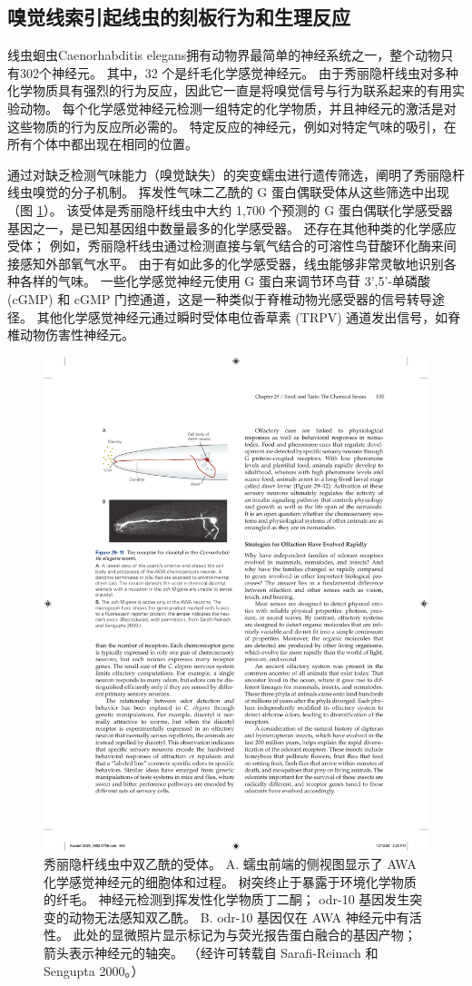 \subsection{嗅觉线索引起线虫的刻板行为和生理反应}
线虫蛔虫Caenorhabditis elegans拥有动物界最简单的神经系统之一，整个动物只有302个神经元。 其中，32 个是纤毛化学感觉神经元。 由于秀丽隐杆线虫对多种化学物质具有强烈的行为反应，因此它一直是将嗅觉信号与行为联系起来的有用实验动物。 每个化学感觉神经元检测一组特定的化学物质，并且神经元的激活是对这些物质的行为反应所必需的。 特定反应的神经元，例如对特定气味的吸引，在所有个体中都出现在相同的位置。

通过对缺乏检测气味能力（嗅觉缺失）的突变蠕虫进行遗传筛选，阐明了秀丽隐杆线虫嗅觉的分子机制。 
挥发性气味二乙酰的 G 蛋白偶联受体从这些筛选中出现（图 \ref{fig:29_11}）。 
该受体是秀丽隐杆线虫中大约 1,700 个预测的 G 蛋白偶联化学感受器基因之一，是已知基因组中数量最多的化学感受器。 还存在其他种类的化学感应受体； 例如，秀丽隐杆线虫通过检测直接与氧气结合的可溶性鸟苷酸环化酶来间接感知外部氧气水平。 由于有如此多的化学感受器，线虫能够非常灵敏地识别各种各样的气味。 一些化学感觉神经元使用 G 蛋白来调节环鸟苷 3',5'-单磷酸 (cGMP) 和 cGMP 门控通道，这是一种类似于脊椎动物光感受器的信号转导途径。 其他化学感觉神经元通过瞬时受体电位香草素 (TRPV) 通道发出信号，如脊椎动物伤害性神经元。

\begin{figure}[htbp]
	\centering
	\includegraphics[width=0.5\linewidth]{chap29/fig_29_11}
	\caption{秀丽隐杆线虫中双乙酰的受体。 A. 蠕虫前端的侧视图显示了 AWA 化学感觉神经元的细胞体和过程。 树突终止于暴露于环境化学物质的纤毛。 神经元检测到挥发性化学物质丁二酮； odr-10 基因发生突变的动物无法感知双乙酰。 B. odr-10 基因仅在 AWA 神经元中有活性。 此处的显微照片显示标记为与荧光报告蛋白融合的基因产物； 箭头表示神经元的轴突。 （经许可转载自 Sarafi-Reinach 和 Sengupta 2000。）}
	\label{fig:29_11}
\end{figure}


